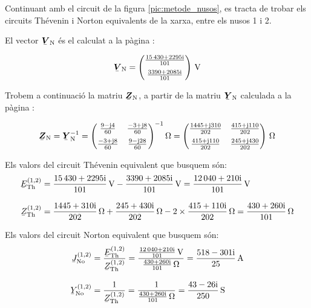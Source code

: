 \begin{exemple}\label{ex:XarxaThevenin}
	\addcontentsxms{\XarxaThevenin}
    Continuant amb el circuit de la figura \vref{pic:metode_nusos}, es
    tracta de trobar els circuits Thévenin i Norton equivalents de la
    xarxa, entre els nusos 1 i 2.

    El vector $\mcmplx{V}\ped{N}$ és el calculat a la pàgina \pageref{eq:vn_exemp}:

    \[
      \mcmplx{V}\ped{N} =
      \begin{pmatrix}
            \frac{\complexnum{15430 + j 2295}}{101} \\[2mm]
            \frac{\complexnum{3390 + j 2085}}{101}
      \end{pmatrix}\,\unit{V}
   \]

    Trobem a continuació la matriu $\mcmplx{Z}\ped{N}$, a partir de la matriu $\mcmplx{Y}\ped{N}$
    calculada a la pàgina \pageref{eq:yn}:

    \[
       \mcmplx{Z}\ped{N} =  \mcmplx{Y}\ped{N}^{-1} =
       \begin{pmatrix}
                \frac{9 - \ju 4}{60} & \frac{-3 + \ju 8}{60} \\[2mm]
                \frac{-3 + \ju 8}{60} & \frac{9 - \ju 28}{60}
          \end{pmatrix} ^{-1}\unit{\ohm} =
       \begin{pmatrix}
             \frac{1445 + \ju 310}{202} & \frac{415 + \ju 110}{202} \\[2mm]
             \frac{415 + \ju 110}{202} & \frac{245 + \ju 430}{202}
       \end{pmatrix}\,\unit{\ohm}
    \]

    Els valors del circuit Thévenin equivalent que busquem són:
    \begin{align*}
       \cmplx{E}\ped{Th}^{(1,2)} &= \frac{\complexnum{15430+j2295}}{101}\,\unit{V} - \frac{\complexnum{3390+j2085}}{101}\,\unit{V} =
       \frac{\complexnum{12040+j210}}{101}\,\unit{V} \\[2ex]
       \cmplx{Z}\ped{Th}^{(1,2)} &= \frac{\complexnum{1445+j310}}{202}\,\unit{\ohm} + \frac{\complexnum{245+j430}}{202}\,\unit{\ohm} -
       2\times\frac{\complexnum{415+j110}}{202}\,\unit{\ohm} = \frac{\complexnum{430+j260}}{101}\,\unit{\ohm}
    \end{align*}

    Els valors del circuit Norton equivalent que busquem són:
    \begin{align*}
       \cmplx{J}\ped{No}^{(1,2)} &= \frac{\cmplx{E}\ped{Th}^{(1,2)}}{\cmplx{Z}\ped{Th}^{(1,2)}} =
       \frac{\frac{\complexnum{12040+j210}}{101}\,\unit{V}}{\frac{\complexnum{430+j260}}{101}\,\unit{\ohm}} =
       \frac{\complexnum{518-j301}}{25}\,\unit{A} \\[2ex]
       \cmplx{Y}\ped{No}^{(1,2)} &= \frac{1}{\cmplx{Z}\ped{Th}^{(1,2)}} =
       \frac{1}{\frac{\complexnum{430+j260}}{101}\,\unit{\ohm}} = \frac{\complexnum{43-j26}}{250}\,\unit{S}
    \end{align*}

\end{exemple}
